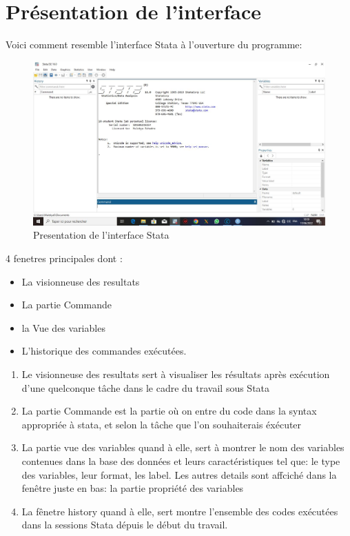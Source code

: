 \documentclass[
]{book}
\providecommand{\tightlist}{%
  \setlength{\itemsep}{0pt}\setlength{\parskip}{0pt}}
\theoremstyle{definition}
\theoremstyle{definition}
\theoremstyle{definition}
\theoremstyle{definition}
\theoremstyle{remark}
\begin{document}
\hypertarget{pruxe9sentation-de-linterface}{%
\section{Présentation de l'interface}\label{pruxe9sentation-de-linterface}}

Voici comment resemble l'interface Stata à l'ouverture du programme:

\begin{figure}
\centering
\includegraphics{"fenetre Stata.jpg"}
\caption{Presentation de l'interface Stata}
\end{figure}

4 fenetres principales dont :

\begin{itemize}
\tightlist
\item
  La visionneuse des resultats
\item
  La partie Commande
\item
  la Vue des variables
\item
  L'historique des commandes exécutées.
\end{itemize}

\begin{enumerate}
\def\labelenumi{(\arabic{enumi})}
\tightlist
\item
  Le visionneuse des resultats sert à visualiser les résultats après exécution d'une quelconque tâche dans le cadre du travail sous Stata
\item
  La partie Commande est la partie où on entre du code dans la syntax appropriée à stata, et selon la tâche que l'on souhaiterais éxécuter
\item
  La partie vue des variables quand à elle, sert à montrer le nom des variables contenues dans la base des données et leurs caractéristiques tel que: le type des variables, leur format, les label. Les autres details sont affciché dans la fenêtre juste en bas: la partie propriété des variables
\item
  La fênetre history quand à elle, sert montre l'ensemble des codes exécutées dans la sessions Stata dépuis le début du travail.
\end{enumerate}
\end{document}
